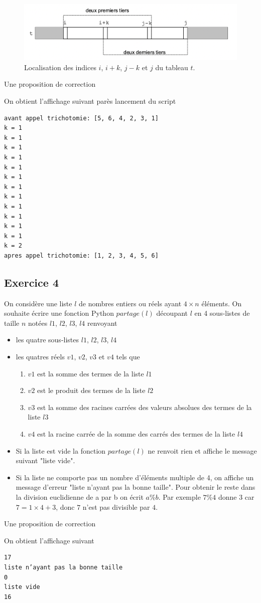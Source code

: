 \documentclass[a4paper,12pt]{article}
\begin{document}
\begin{figure}[htbp]
\begin{center}
\includegraphics[width=16cm]{./2024/trichotomie.png}
\end{center}
\caption{Localisation des indices $i$, $i+k$, $j-k$ et $j$ du tableau $t$.}
\end{figure}
\clearpage
Une proposition de correction

On obtient l'affichage suivant par\`es lancement du script
\begin{verbatim}
avant appel trichotomie: [5, 6, 4, 2, 3, 1]
k = 1
k = 1
k = 1
k = 1
k = 1
k = 1
k = 1
k = 1
k = 1
k = 1
k = 1
k = 1
k = 2
apres appel trichotomie: [1, 2, 3, 4, 5, 6]
\end{verbatim}

\clearpage
\subsection{Exercice 4}
\begin{leftbar}
On consid\`ere une liste $l$ de nombres entiers ou r\'eels ayant $4\times n$ \'el\'ements.
On souhaite \'ecrire une fonction Python $partage(l)$ d\'ecoupant $l$ en 4 sous-listes de taille $n$ not\'ees $l1$, $l2$, $l3$, $l4$ renvoyant
\begin{itemize}
\item les quatre sous-listes $l1$, $l2$, $l3$, $l4$
\item les quatres r\'eels $v1$, $v2$, $v3$ et $v4$ tels que 
\begin{enumerate}
\item $v1$ est la somme des termes de la liste $l1$
\item $v2$ est le produit des termes de la liste $l2$
\item $v3$ est la somme des racines carr\'ees des valeurs absolues des termes de la  liste $l3$
\item $v4$ est la racine carr\'ee de la somme des carr\'es des termes de la liste $l4$
\end{enumerate}
\end{itemize}
\begin{itemize}
\item Si la liste est vide la fonction  $partage(l)$ ne renvoit rien et affiche le message suivant "liste vide". \item Si la liste ne comporte pas un nombre d'\'el\'ements multiple de 4, on affiche un message d'erreur "liste n'ayant pas la bonne taille". Pour obtenir le reste dans la division euclidienne de a par b on \'ecrit $a\%b$.  Par exemple $7\%4$ donne $3$ car $7=1\times 4+3$, donc $7$ n'est pas divisible par $4$.
\end{itemize}
 \end{leftbar}
 
 \clearpage
Une proposition de correction

On obtient l'affichage suivant
\begin{verbatim}
17
liste n’ayant pas la bonne taille
0
liste vide
16
\end{verbatim}
\end{document}
